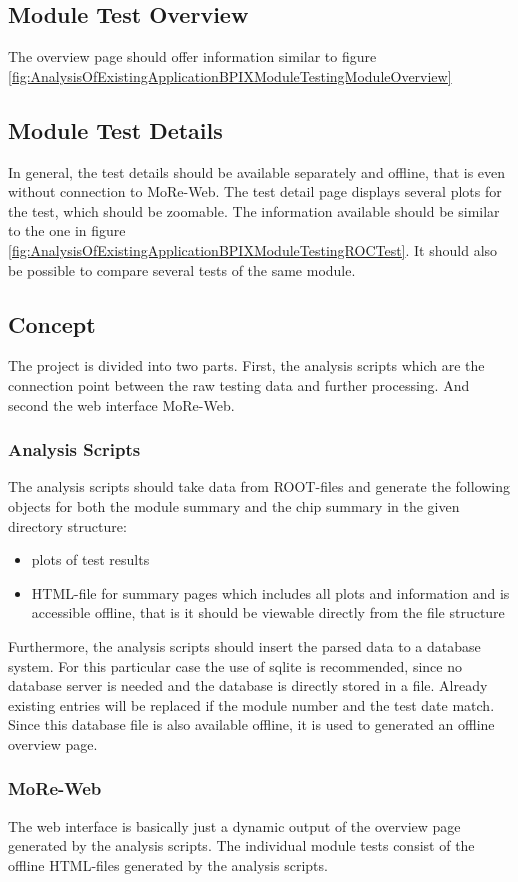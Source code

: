 \documentclass[0_Bericht]{subfiles}
\begin{document}
			\subsection{Module Test Overview}
				The overview page should offer information similar to figure \ref{fig:AnalysisOfExistingApplicationBPIXModuleTestingModuleOverview}
			\subsection{Module Test Details}
				In general, the test details should be available separately and offline, that is even without connection to MoRe-Web.
				The test detail page displays several plots for the test, which should be zoomable. The information available should be similar to the one in figure \ref{fig:AnalysisOfExistingApplicationBPIXModuleTestingROCTest}.
				It should also be possible to compare several tests of the same module.
		\subsection{Concept}
			The project is divided into two parts. First, the analysis scripts which are the connection point between the raw testing data and further processing. And second the web interface MoRe-Web.
			\subsubsection{Analysis Scripts}
				The analysis scripts should take data from ROOT-files and generate the following objects for both the module summary and the chip summary in the given directory structure:
				\begin{itemize}
					\item plots of test results
					\item HTML-file for summary pages which includes all plots and information and is accessible offline, that is it should be viewable directly from the file structure
				\end{itemize}
				Furthermore, the analysis scripts should insert the parsed data to a database system. For this particular case the use of sqlite is recommended, since no database server is needed and the database is directly stored in a file. Already existing entries will be replaced if the module number and the test date match.
				Since this database file is also available offline, it is used to generated an offline overview page.
			\subsubsection{MoRe-Web}
				The web interface is basically just a dynamic output of the overview page generated by the analysis scripts. The individual module tests consist of the offline HTML-files generated by the analysis scripts.
\end{document}
